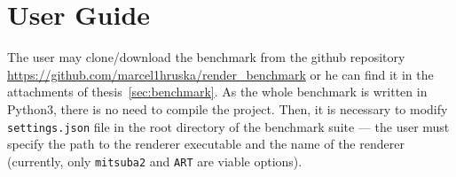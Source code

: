 \documentclass[12pt,a4paper]{report}
\begin{document}



\tableofcontents














\appendix
\chapter{User Guide}

The user may clone/download the benchmark from the github repository \url{https://github.com/marcel1hruska/render_benchmark} or he can find it in the attachments of thesis~\ref{sec:benchmark}. As the whole benchmark is written in Python3, there is no need to compile the project. Then, it is necessary to modify \texttt{settings.json} file in the root directory of the benchmark suite --- the user must specify the path to the renderer executable and the name of the renderer (currently, only \texttt{mitsuba2} and \texttt{ART} are viable options).
\end{document}
